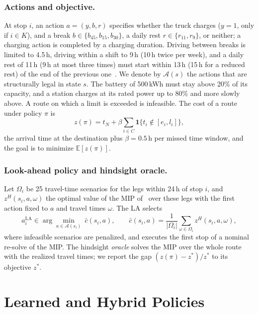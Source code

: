 \documentclass[runningheads]{llncs}
\begin{document}
\subsubsection{Actions and objective.}
At stop $i$, an action $a=(y,b,r)$ specifies whether the truck charges ($y=1$,
only if $i\in K$), and a break $b\in\{b_{45},b_{15},b_{30}\}$, a daily rest
$r\in\{r_{11},r_9\}$, or neither; a charging action is completed by a charging
duration. Driving between breaks is limited to 4.5\,h, driving within a shift
to 9\,h (10\,h twice per week), and a daily rest of 11\,h (9\,h at most three
times) must start within 13\,h (15\,h for a reduced rest) of the end of the
previous one~\cite{eu561,eu2002_15}. We denote by $\mathcal{A}(s)$ the actions
that are structurally legal in state $s$. The battery of 500\,kWh must stay
above 20\% of its capacity, and a station charges at its rated power up to
80\% and more slowly above. A route on which a limit is exceeded is
infeasible. The cost of a route under policy $\pi$ is
\begin{equation}
z(\pi)=t_N+\beta\sum_{i\in C}\mathbf{1}\{t_i\notin[e_i,l_i]\},
\label{eq:obj}
\end{equation}
the arrival time at the destination plus $\beta=0.5$\,h per missed time window,
and the goal is to minimize $\mathbb{E}[z(\pi)]$.

\subsubsection{Look-ahead policy and hindsight oracle.}
Let $\Omega_i$ be 25 travel-time scenarios for the legs within 24\,h of stop
$i$, and $z^H(s_i,a,\omega)$ the optimal value of the MIP
of~\cite{pagnier_bakker_journal} over these legs with the first action fixed
to $a$ and travel times $\omega$. The LA selects
\begin{equation}
a_i^{\mathrm{LA}}\in\arg\min_{a\in\mathcal{A}(s_i)}\ \bar c(s_i,a),\qquad
\bar c(s_i,a)=\frac{1}{|\Omega_i|}\sum_{\omega\in\Omega_i}z^H(s_i,a,\omega),
\label{eq:la}
\end{equation}
where infeasible scenarios are penalized, and executes the first stop of a
nominal re-solve of the MIP. The hindsight \emph{oracle} solves the MIP over
the whole route with the realized travel times; we report the gap
$(z(\pi)-z^\ast)/z^\ast$ to its objective $z^\ast$.

\section{Learned and Hybrid Policies}
\label{sec:method}
\end{document}

